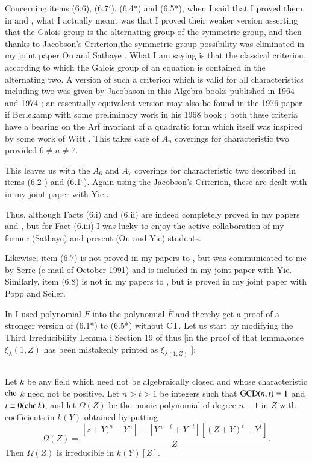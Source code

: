 Concerning items (6.6), (6.7$'$), (6.4*) and (6.5*), when I said that I proved them in \cite{chap1-key8} and \cite{chap1-key10}, what I actually meant was that I proved their weaker version asserting that the Galois group is the alternating group of the symmetric group, and then thanks to Jacobson's Criterion,the symmetric group possibility was eliminated in my joint paper Ou and Sathaye \cite{chap1-key14}. What I am saying is that the classical criterion, according to which the Galois group of an equation is contained in the alternating two. A version of such a criterion which is valid for all characteristics including two was given by Jacobason in this Algebra books published in 1964 \cite{chap1-key37} and 1974 \cite{chap1-key38}; an essentially equivalent version may also be found in the 1976 paper \cite{chap1-key20} if Berlekamp with some preliminary work in his 1968 book \cite{chap1-key19}; both these criteria have a bearing on the Arf invariant of a quadratic form \cite{chap1-key18} which itself was inspired by some work of Witt \cite{chap1-key61}. This takes care of $A_{n}$ coverings for characteristic two provided $ 6 \neq n \neq 7$. 

This leaves us with the $A_{6}$ and $A_{7}$ coverings for characteristic two described in items (6.2$^\circ$) and (6.1$^\circ$). Again using the Jacobson's Criterion, these are dealt with in my joint paper with Yie \cite{chap1-key17}.

Thus, although Facts (6.i) and (6.ii) are indeed completely proved in my papers \cite{chap1-key8} and \cite{chap1-key10}, but for Fact (6.iii) I was lucky to enjoy the active collaboration of my former (Sathaye) and present (Ou and Yie) students.

Likewise, item (6.7) is not proved in my papers \cite{chap1-key8} to \cite{chap1-key10}, but was communicated to me by Serre (e-mail of October 1991) and is included in my joint paper \cite{chap1-key17} with Yie. Similarly, item (6.8) is not in my papers \cite{chap1-key8} to \cite{chap1-key10}, but is proved in my joint paper \cite{chap1-key15} with Popp and Seiler.

In \cite{chap1-key8} I used polynomial $\widetilde{F}$ into the polynomial  $\overline{F}$ and thereby get a proof of a stronger version of (6.1*) to (6.5*) without CT. Let us start by modifying the Third Irreducibility Lemma i Section 19 of \cite{chap1-key8} thus [in the proof of that lemma,once $\xi_{\lambda}(1, Z)$ has been mistakenly printed as $\xi_{\lambda(1, Z)}$ ]:

\subsection{}
Let $k$ be any field which need not be algebraically closed and whose characteristic $\operatorname{chc}$ $k$ need not be positive. Let $n > t > 1$ be integers such that $\operatorname{GCD}(n,t)=1$ and $t\equiv 0(\operatorname{chc} k)$, and let $\Omega(Z)$ be the monic polynomial of degree $n-1$ in $Z$ with coefficients in $k(Y)$ obtained by putting
$$
\Omega(Z)= \dfrac{\left[z+Y)^{n}-Y^{n}\right]-\left[Y^{n-t}+Y^{-t}\right]\left[(Z+Y)^{t}-Y^{t}\right]}{Z}.   
$$
Then $\Omega(Z)$ is irreducible in $k(Y)[Z]$.

